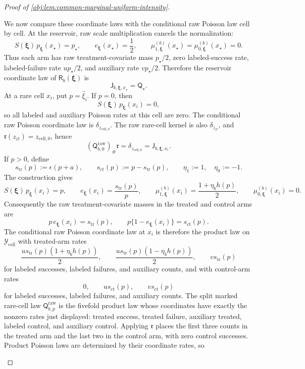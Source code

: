 \begin{proof}[Proof of \cref{obj:lem:common-marginal-uniform-intensity}]
\begin{enumerate}
We now compare these coordinate laws with the conditional raw Poisson law cell by cell. At the reservoir, raw scale multiplication cancels the normalization:
\[
S(\boldsymbol\xi)\,p_{\boldsymbol\xi}(x_\star)=p_\star,
\qquad e_{\boldsymbol\xi}(x_\star)=\frac12,
\qquad \mu^{(b)}_{1,\boldsymbol\xi}(x_\star)=\mu^{(b)}_{0,\boldsymbol\xi}(x_\star)=0.
\]
Thus each arm has raw treatment-covariate mass \(p_\star/2\), zero labeled-success rate, labeled-failure rate \(u p_\star/2\), and auxiliary rate \(v p_\star/2\). Therefore the reservoir coordinate law of \(\mathsf R_b(\boldsymbol\xi)\) is
\[
\mathsf J_{b,\boldsymbol\xi,x_\star}=\mathsf Q_\star .
\]
At a rare cell \(x_i\), put \(p=\widehat\xi_i\). If \(p=0\), then
\[
S(\boldsymbol\xi)\,p_{\boldsymbol\xi}(x_i)=0,
\]
so all labeled and auxiliary Poisson rates at this cell are zero. The conditional raw Poisson coordinate law is \(\delta_{z_{\mathrm{cell},0}}\). The raw rare-cell kernel is also \(\delta_{z_{\varnothing}}\), and \(\mathfrak r(z_{\varnothing})=z_{\mathrm{cell},0}\), hence
\[
(\mathsf Q^{\mathrm{raw}}_{b,0})_\#\mathfrak r
=\delta_{z_{\mathrm{cell},0}}
=\mathsf J_{b,\boldsymbol\xi,x_i} .
\]
If \(p>0\), define
\[
s_{\mathrm{tr}}(p):=\epsilon(p+a),
\qquad
s_{\mathrm{ct}}(p):=p-s_{\mathrm{tr}}(p),
\qquad
\eta_1:=1,
\quad
\eta_0:=-1.
\]
The construction gives
\[
S(\boldsymbol\xi)\,p_{\boldsymbol\xi}(x_i)=p,
\qquad
e_{\boldsymbol\xi}(x_i)=\frac{s_{\mathrm{tr}}(p)}{p},
\qquad
\mu^{(b)}_{1,\boldsymbol\xi}(x_i)=\frac{1+\eta_b h(p)}2,
\qquad
\mu^{(b)}_{0,\boldsymbol\xi}(x_i)=0.
\]
Consequently the raw treatment-covariate masses in the treated and control arms are
\[
p\,e_{\boldsymbol\xi}(x_i)=s_{\mathrm{tr}}(p),
\qquad
p\{1-e_{\boldsymbol\xi}(x_i)\}=s_{\mathrm{ct}}(p).
\]
The conditional raw Poisson coordinate law at \(x_i\) is therefore the product law on \(\mathcal Y_{\mathrm{cell}}\) with treated-arm rates
\[
\frac{u s_{\mathrm{tr}}(p)(1+\eta_b h(p))}{2},
\qquad
\frac{u s_{\mathrm{tr}}(p)(1-\eta_b h(p))}{2},
\qquad
v s_{\mathrm{tr}}(p)
\]
for labeled successes, labeled failures, and auxiliary counts, and with control-arm rates
\[
0,
\qquad
u s_{\mathrm{ct}}(p),
\qquad
v s_{\mathrm{ct}}(p)
\]
for labeled successes, labeled failures, and auxiliary counts. The split marked rare-cell law \(\mathsf Q^{\mathrm{raw}}_{b,p}\) is the fivefold product law whose coordinates have exactly the nonzero rates just displayed: treated success, treated failure, auxiliary treated, labeled control, and auxiliary control. Applying \(\mathfrak r\) places the first three counts in the treated arm and the last two in the control arm, with zero control successes. Product Poisson laws are determined by their coordinate rates, so

\end{enumerate}
\end{proof}
